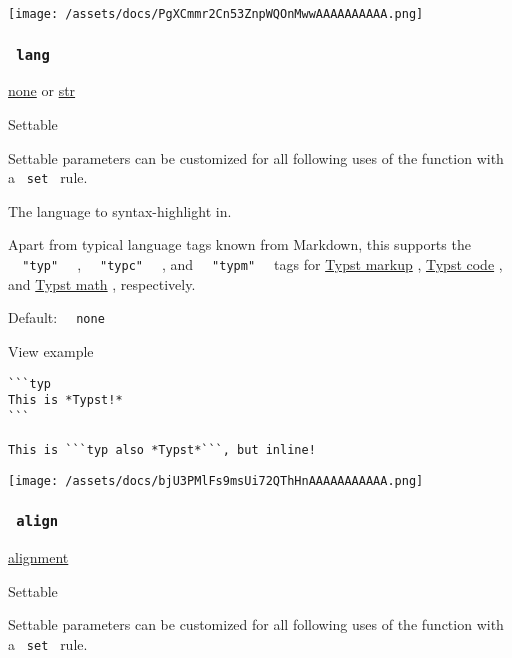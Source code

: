 \texttt{[image: /assets/docs/PgXCmmr2Cn53ZnpWQOnMwwAAAAAAAAAA.png]}

\subsubsection{\texorpdfstring{\texttt{\ lang\ }}{ lang }}\label{parameters-lang}

\href{/docs/reference/foundations/none/}{none} {or}
\href{/docs/reference/foundations/str/}{str}

{{ Settable }}

\label{parameters-lang-settable-tooltip}
Settable parameters can be customized for all following uses of the
function with a \texttt{\ set\ } rule.

The language to syntax-highlight in.

Apart from typical language tags known from Markdown, this supports the
\texttt{\ }{\texttt{\ "typ"\ }}\texttt{\ } ,
\texttt{\ }{\texttt{\ "typc"\ }}\texttt{\ } , and
\texttt{\ }{\texttt{\ "typm"\ }}\texttt{\ } tags for
\href{/docs/reference/syntax/\#markup}{Typst markup} ,
\href{/docs/reference/syntax/\#code}{Typst code} , and
\href{/docs/reference/syntax/\#math}{Typst math} , respectively.

Default: \texttt{\ }{\texttt{\ none\ }}\texttt{\ }


View example

\begin{verbatim}
```typ
This is *Typst!*
```

This is ```typ also *Typst*```, but inline!
\end{verbatim}

\texttt{[image: /assets/docs/bjU3PMlFs9msUi72QThHnAAAAAAAAAAA.png]}

\subsubsection{\texorpdfstring{\texttt{\ align\ }}{ align }}\label{parameters-align}

\href{/docs/reference/layout/alignment/}{alignment}

{{ Settable }}

\label{parameters-align-settable-tooltip}
Settable parameters can be customized for all following uses of the
function with a \texttt{\ set\ } rule.

